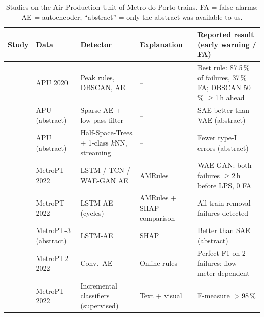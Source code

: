 \begin{table}[H]
\centering
\caption[Studies on the Air Production Unit of Metro do Porto trains]{Studies on the Air Production Unit of Metro do Porto trains. FA = false alarms; AE = autoencoder; ``abstract'' = only the abstract was available to us.}
\label{tab:apu}
\footnotesize
\setlength{\tabcolsep}{3pt}
\begin{tabular}{>{\raggedright\arraybackslash}p{2.4cm}>{\raggedright\arraybackslash}p{1.8cm}>{\raggedright\arraybackslash}p{3.3cm}>{\raggedright\arraybackslash}p{1.9cm}>{\raggedright\arraybackslash}p{4.4cm}}
\toprule
Study & Data & Detector & Explanation & Reported result (early warning / FA) \\
\midrule
\citet{barros2020thesis} & APU 2020 & Peak rules, DBSCAN, AE & -- & Best rule: 87.5\,\% of failures, 37\,\% FA; DBSCAN 50\,\% $\geq$1\,h ahead \\
\citet{davari2021dsaa} & APU (abstract) & Sparse AE + low-pass filter & -- & SAE better than VAE (abstract) \\
\citet{meira2023framework} & APU (abstract) & Half-Space-Trees + 1-class $k$NN, streaming & -- & Fewer type-I errors (abstract) \\
\citet{silva2023adversarial} & MetroPT 2022 & LSTM / TCN / WAE-GAN AE & AMRules & WAE-GAN: both failures $\geq$2\,h before LPS, 0 FA \\
\citet{gama2024neurosymbolic} & MetroPT 2022 & LSTM-AE (cycles) & AMRules + SHAP comparison & All train-removal failures detected \\
\citet{davari2024explaining} & MetroPT-3 (abstract) & LSTM-AE & SHAP & Better than SAE (abstract) \\
\citet{jakobs2025rules} & MetroPT2 2022 & Conv.\ AE & Online rules & Perfect F1 on 2 failures; flow-meter dependent \\
\citet{garciamendez2025explainable} & MetroPT 2022 & Incremental classifiers (supervised) & Text + visual & F-measure $>$98\,\% \\
\bottomrule
\end{tabular}
\end{table}

